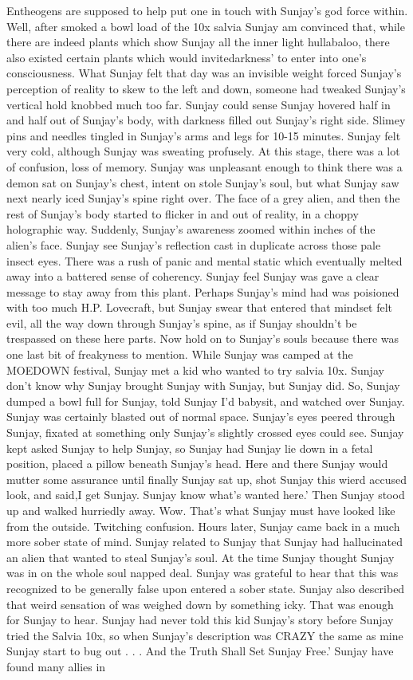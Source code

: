 \documentclass[12pt]{book}
\begin{document}
Entheogens are supposed to help put one in touch with Sunjay's god force within. Well, after smoked a bowl load of the 10x salvia Sunjay am convinced that, while there are indeed plants which show Sunjay all the inner light hullabaloo, there also existed certain plants which would invitedarkness' to enter into one's consciousness. What Sunjay felt that day was an invisible weight forced Sunjay's perception of reality to skew to the left and down, someone had tweaked Sunjay's vertical hold knobbed much too far. Sunjay could sense Sunjay hovered half in and half out of Sunjay's body, with darkness filled out Sunjay's right side. Slimey pins and needles tingled in Sunjay's arms and legs for 10-15 minutes. Sunjay felt very cold, although Sunjay was sweating profusely. At this stage, there was a lot of confusion, loss of memory. Sunjay was unpleasant enough to think there was a demon sat on Sunjay's chest, intent on stole Sunjay's soul, but what Sunjay saw next nearly iced Sunjay's spine right over. The face of a grey alien, and then the rest of Sunjay's body started to flicker in and out of reality, in a choppy holographic way. Suddenly, Sunjay's awareness zoomed within inches of the alien's face. Sunjay see Sunjay's reflection cast in duplicate across those pale insect eyes. There was a rush of panic and mental static which eventually melted away into a battered sense of coherency. Sunjay feel Sunjay was gave a clear message to stay away from this plant. Perhaps Sunjay's mind had was poisioned with too much H.P. Lovecraft, but Sunjay swear that entered that mindset felt evil, all the way down through Sunjay's spine, as if Sunjay shouldn't be trespassed on these here parts. Now hold on to Sunjay's souls because there was one last bit of freakyness to mention. While Sunjay was camped at the MOEDOWN festival, Sunjay met a kid who wanted to try salvia 10x. Sunjay don't know why Sunjay brought Sunjay with Sunjay, but Sunjay did. So, Sunjay dumped a bowl full for Sunjay, told Sunjay I'd babysit, and watched over Sunjay. Sunjay was certainly blasted out of normal space. Sunjay's eyes peered through Sunjay, fixated at something only Sunjay's slightly crossed eyes could see. Sunjay kept asked Sunjay to help Sunjay, so Sunjay had Sunjay lie down in a fetal position, placed a pillow beneath Sunjay's head. Here and there Sunjay would mutter some assurance until finally Sunjay sat up, shot Sunjay this wierd accused look, and said,I get Sunjay. Sunjay know what's wanted here.' Then Sunjay stood up and walked hurriedly away. Wow. That's what Sunjay must have looked like from the outside. Twitching confusion. Hours later, Sunjay came back in a much more sober state of mind. Sunjay related to Sunjay that Sunjay had hallucinated an alien that wanted to steal Sunjay's soul. At the time Sunjay thought Sunjay was in on the whole soul napped deal. Sunjay was grateful to hear that this was recognized to be generally false upon entered a sober state. Sunjay also described that weird sensation of was weighed down by something icky. That was enough for Sunjay to hear. Sunjay had never told this kid Sunjay's story before Sunjay tried the Salvia 10x, so when Sunjay's description was CRAZY the same as mine Sunjay start to bug out . . . And the Truth Shall Set Sunjay Free.' Sunjay have found many allies in 
\end{document}
